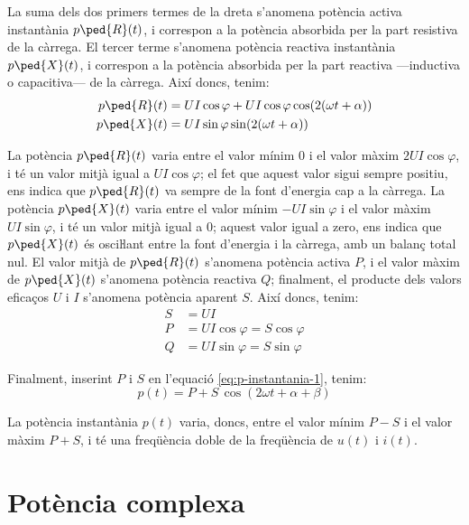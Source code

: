 La suma dels dos primers termes de la dreta  s'anomena potència activa instantània $p\ped{R}(t)$, i correspon a la potència absorbida per la part resistiva de la càrrega. El tercer terme  s'anomena potència reactiva instantània $p\ped{X}(t)$, i correspon a la potència absorbida per la part reactiva ---inductiva o capacitiva--- de la càrrega. Així doncs, tenim:
\begin{subequations}
\begin{align}
  p\ped{R}(t) &=  U I \cos\varphi + U I \cos\varphi \cos (2 (\omega t + \alpha)) \\
  p\ped{X}(t) &=  U I \sin\varphi \sin (2 (\omega t + \alpha))
\end{align}
\end{subequations}
	
La potència $p\ped{R}(t)$ varia entre el valor mínim 0 i el valor màxim $2 U I \cos\varphi$,
i té un valor mitjà igual a $U I \cos\varphi$; el fet que aquest valor sigui sempre positiu,
ens indica que $p\ped{R}(t)$  va sempre de la font d'energia cap a la càrrega.
La potència $p\ped{X}(t)$ varia entre el valor mínim $-U I \sin\varphi$ i el valor
màxim $U I \sin\varphi$, i té un valor mitjà igual a 0; aquest valor igual a zero,
ens indica que $p\ped{X}(t)$ és osciŀlant entre la font d'energia i la càrrega,
amb un balanç total nul. El valor mitjà de $p\ped{R}(t)$ s'anomena potència activa $P$, i el
valor màxim de $p\ped{X}(t)$ s'anomena potència reactiva $Q$; finalment, el producte dels valors
eficaços $U$ i $I$ s'anomena potència aparent $S$. Així doncs, tenim:
\begin{align}
  S &= U I \\
  P &= U I \cos\varphi = S \cos\varphi\\
  Q &= U I \sin\varphi = S \sin\varphi
\end{align}

Finalment, inserint $P$ i $S$ en l'equació \eqref{eq:p-instantania-1},  tenim:
\begin{equation}
	p(t) = P + S \,\cos(2 \omega t + \alpha +  \beta)
\end{equation}

La potència instantània $p(t)$ varia, doncs, entre el valor mínim $P - S$ i el valor màxim $P + S$, i té una freqüència doble de la freqüència de $u(t)$ i $i(t)$.

\section{Potència complexa}\label{sec:pot_complex} 

